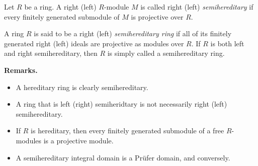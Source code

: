 \documentclass[12pt]{article}
\begin{document}
Let $R$ be a ring.  A right (left) $R$-module $M$ is called right (left) \emph{semihereditary} if every finitely generated submodule of $M$ is projective over $R$.

A ring $R$ is said to be a right (left) \emph{semihereditary ring} if all of its finitely generated right (left) ideals are projective as modules over $R$.  If $R$ is both left and right semihereditary, then $R$ is simply called a semihereditary ring.

\textbf{Remarks.}
\begin{itemize}
\item A hereditary ring is clearly semihereditary.
\item A ring that is left (right) semiheridtary is not necessarily right (left) semihereditary.
\item If $R$ is hereditary, then every finitely generated submodule of a free $R$-modules is a projective module.
\item A semihereditary integral domain is a Pr\"ufer domain, and conversely.
\end{itemize}
\end{document}
